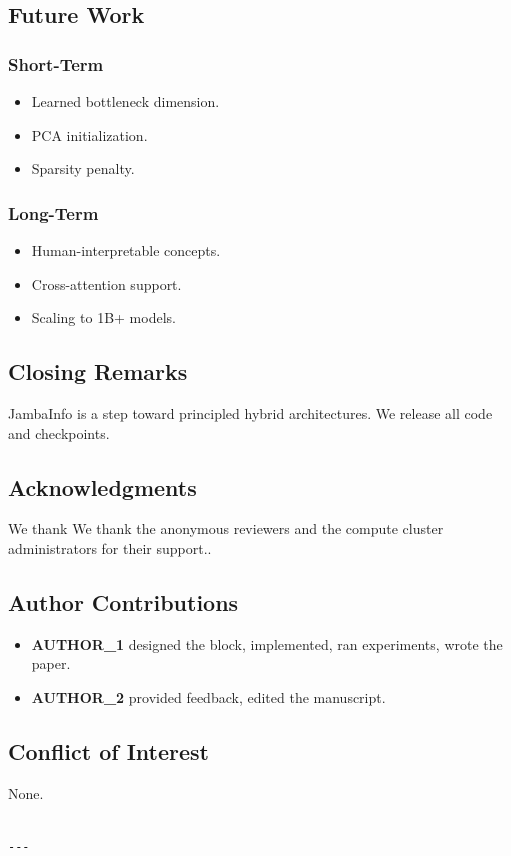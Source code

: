 \subsection{Future Work}

\subsubsection{Short-Term}
\begin{itemize}
\item Learned bottleneck dimension.
\item PCA initialization.
\item Sparsity penalty.

\end{itemize}
\subsubsection{Long-Term}
\begin{itemize}
\item Human-interpretable concepts.
\item Cross-attention support.
\item Scaling to 1B+ models.

\end{itemize}
\subsection{Closing Remarks}

JambaInfo is a step toward principled hybrid architectures. We release 
all code and checkpoints.

\subsection{Acknowledgments}

We thank We thank the anonymous reviewers and the compute cluster administrators for their support..

\subsection{Author Contributions}

\begin{itemize}
\item \textbf{{{AUTHOR\_1}}} designed the block, implemented, ran experiments, wrote
  the paper.
\item \textbf{{{AUTHOR\_2}}} provided feedback, edited the manuscript.

\end{itemize}
\subsection{Conflict of Interest}

None.
\begin{lstlisting}

---
\end{lstlisting}